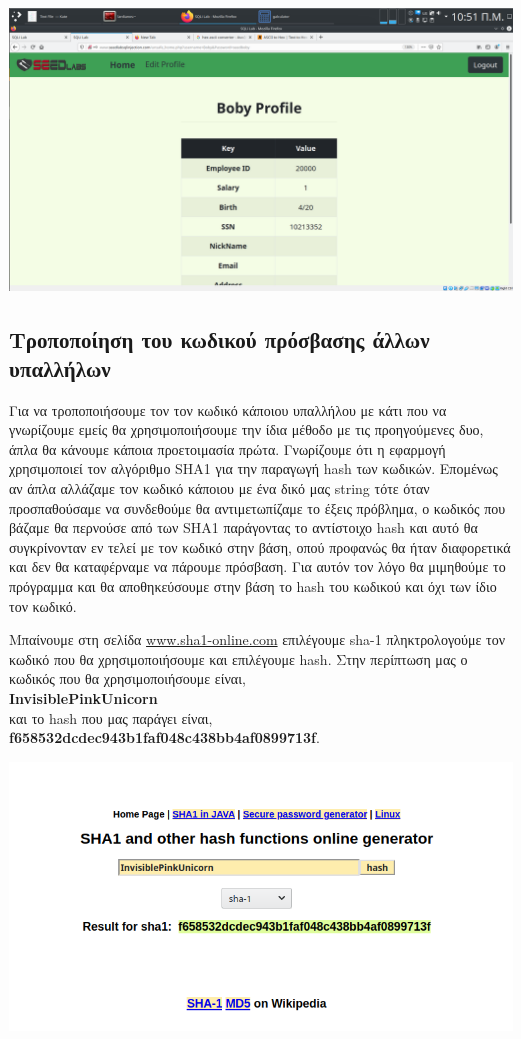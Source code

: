 \begin{center}
			\includegraphics[width=1\textwidth]{image/3.2.2.PNG}		
\end{center}

\subsection{Τροποποίηση του κωδικού πρόσβασης άλλων υπαλλήλων}

Για να τροποποιήσουμε τον τον κωδικό κάποιου υπαλλήλου με κάτι που να γνωρίζουμε
εμείς θα χρησιμοποιήσουμε την ίδια μέθοδο με τις προηγούμενες δυο, άπλα θα 
κάνουμε κάποια προετοιμασία πρώτα. Γνωρίζουμε ότι η εφαρμογή χρησιμοποιεί 
τον αλγόριθμο SHA1 για την παραγωγή hash των κωδικών. Επομένως αν άπλα 
αλλάζαμε τον κωδικό κάποιου με ένα δικό μας string τότε όταν προσπαθούσαμε
να συνδεθούμε θα αντιμετωπίζαμε το έξεις πρόβλημα, ο κωδικός που βάζαμε
θα περνούσε από των SHA1 παράγοντας το αντίστοιχο hash και αυτό θα συγκρίνονταν
εν τελεί με τον κωδικό στην βάση, οπού προφανώς θα ήταν διαφορετικά και δεν θα
καταφέρναμε να πάρουμε πρόσβαση. 
Για αυτόν τον λόγο θα μιμηθούμε το πρόγραμμα και θα αποθηκεύσουμε στην βάση
το hash του κωδικού και όχι των ίδιο τον κωδικό.

\noindent
Μπαίνουμε στη σελίδα \url{www.sha1-online.com} επιλέγουμε sha-1 πληκτρολογούμε
τον κωδικό που θα χρησιμοποιήσουμε και επιλέγουμε hash.
Στην περίπτωση μας ο κωδικός που θα χρησιμοποιήσουμε είναι, \\ \textbf{InvisiblePinkUnicorn} \\
και το hash που μας παράγει είναι, \\ \textbf{f658532dcdec943b1faf048c438bb4af0899713f}.

\begin{center}
			\includegraphics[width=1\textwidth]{image/3.3.5.PNG}		
\end{center}

